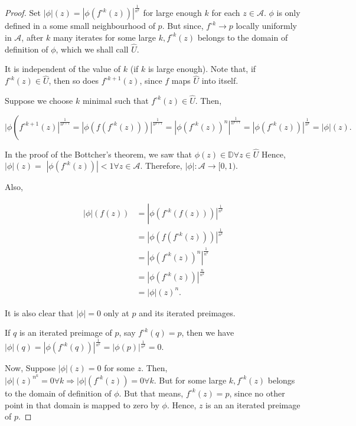 \begin{proof}
Set $|\phi|(z)=\left|\phi\left(f^{\circ k}(z)\right)\right|^{\frac{1}{n^{k}}}$ for large enough $k$ for each $z \in \mathcal{A}$. $\phi$ is only defined in a some small neighbourhood of $p$. But since, $f^{\circ k} \rightarrow p$ locally uniformly in $\mathcal{A}$, after $k$ many iterates for some large $k, f^{\circ k}(z)$ belongs to the domain of definition of $\phi$, which we shall call $\hat{U}$.

It is independent of the value of $k$ (if $k$ is large enough). Note that, if $f^{\circ k}(z) \in \hat{U}$, then so does $f^{\circ k+1}(z)$, since $f$ maps $\hat{U}$ into itself.

Suppose we choose $k$ minimal such that $f^{\circ k}(z) \in \hat{U}$. Then,

$$
\mid \phi\left(\left.f^{\circ k+1}(z)\right|^{\frac{1}{n^{k+1}}}=\left|\phi\left(f\left(f^{\circ k}(z)\right)\right)\right|^{\frac{1}{n^{k+1}}}=\left|\phi\left(f^{\circ k}(z)\right)^{n}\right|^{\frac{1}{n^{k+1}}}=\left|\phi\left(f^{\circ k}(z)\right)\right|^{\frac{1}{n^{k}}}=|\phi|(z) .\right.
$$

In the proof of the Bottcher's theorem, we saw that $\phi(z) \in \mathbb{D} \forall z \in \hat{U}$ Hence, $|\phi|(z)=$ $\left|\phi\left(f^{\circ k}(z)\right)\right|<1 \forall z \in \mathcal{A}$. Therefore, $|\phi|: \mathcal{A} \rightarrow[0,1)$.

Also,

$$
\begin{aligned}
|\phi|(f(z)) & =\left| \phi\left(\left.f^{\circ k}(f(z))\right)\right|^{\frac{1}{n^{k}}}\right. \\
& =\left|\phi\left(f\left(f^{\circ k}(z)\right)\right)\right|^{\frac{1}{n^{k}}} \\
& =\left|\phi\left(f^{\circ k}(z)\right)^{n}\right|^{\frac{1}{n^{k}}} \\
& =\left|\phi\left(f^{\circ k}(z)\right)\right|^{\frac{n}{n^{k}}} \\
& =|\phi|(z)^{n} .
\end{aligned}
$$

It is also clear that $|\phi|=0$ only at $p$ and its iterated preimages.

If $q$ is an iterated preimage of $p$, say $f^{\circ k}(q)=p$, then we have $|\phi|(q)=\left|\phi\left(f^{\circ k}(q)\right)\right|^{\frac{1}{n^{k}}}=|\phi(p)|^{\frac{1}{n^{k}}}=0$.

Now, Suppose $|\phi|(z)=0$ for some $z$. Then, $|\phi|(z)^{n^{k}}=0 \forall k \Longrightarrow|\phi|\left(f^{\circ k}(z)\right)=0 \forall k$. But for some large $k, f^{\circ k}(z)$ belongs to the domain of definition of $\phi$. But that means, $f^{\circ k}(z)=p$, since no other point in that domain is mapped to zero by $\phi$. Hence, $z$ is an an iterated preimage of $p$.


\end{proof}
